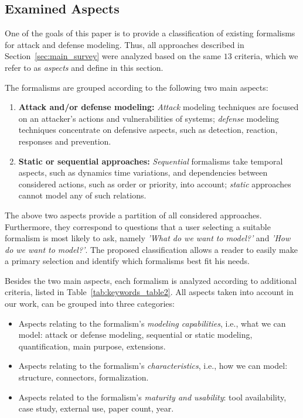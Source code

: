 \documentclass[a4paper]{article}
\begin{document}
\subsection{Examined Aspects}
\label{sec:examined_aspects}

One of the goals of this paper is to provide a classification of existing
formalisms for attack and defense modeling. Thus, all approaches described in
Section~\ref{sec:main_survey} were analyzed based on the same $13$ criteria,
which we refer to as \emph{aspects} and define in this section.

The formalisms are grouped according to the following two main aspects:
\begin{enumerate}
\item \textbf{Attack and/or defense modeling:}
\emph{Attack} modeling techniques are focused on an attacker's actions and
vulnerabilities of systems; \emph{defense} modeling techniques concentrate on 
defensive aspects, such as detection, reaction, responses and prevention. 
\item \textbf{Static or sequential approaches:} 
\emph{Sequential} formalisms take temporal aspects, such as dynamics time 
variations, and dependencies between considered actions, such as order or 
priority, into account; \emph{static} approaches cannot model any of such 
relations.
\end{enumerate}

The above two aspects provide a partition of all considered approaches. 
Furthermore, they correspond to questions that a user selecting a suitable
formalism is most likely to ask, namely \emph{'What do we want to model?'} and
\emph{'How do we want to model?'}. The proposed classification allows a reader
to easily make a primary selection and identify which formalisms best fit his 
needs. 

Besides the two main aspects, each formalism is analyzed according to 
additional criteria, listed in Table~\ref{tab:keywords_table2}. All aspects
taken into account in our work, can be grouped into three categories:
\begin{itemize}
\item Aspects relating to the formalism's \emph{modeling capabilities}, i.e., 
what we can model: attack or defense modeling, sequential or static modeling, 
quantification, main purpose, extensions.
\item Aspects relating to the formalism's \emph{characteristics}, i.e., how we 
can model: structure, connectors, formalization.
\item Aspects related to the formalism's \emph{maturity and usability}: tool
availability, case study, external use, paper count, year.
\end{itemize}
\end{document}
